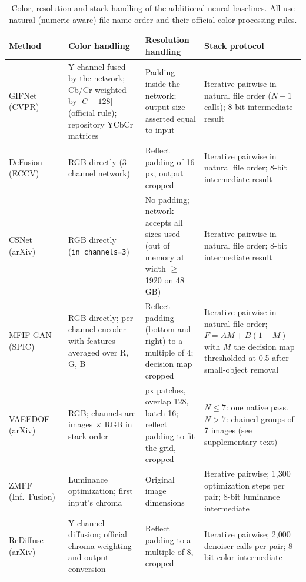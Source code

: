 \begin{table}[htbp]
\caption{Color, resolution and stack handling of the additional neural baselines. All use natural (numeric-aware) file name order and their official color-processing rules.}
\label{tab:deploy_handling}
\scriptsize
\renewcommand{\arraystretch}{0.95}
\setlength{\abovecaptionskip}{2pt}
\setlength{\belowcaptionskip}{2pt}
\begin{tabular}{@{}>{\raggedright\arraybackslash}p{1.9cm}>{\raggedright\arraybackslash}p{3.1cm}>{\raggedright\arraybackslash}p{3.1cm}>{\raggedright\arraybackslash}p{3.8cm}@{}}
\toprule
Method & Color handling & Resolution handling & Stack protocol \\
\midrule
GIFNet (CVPR)~\cite{cheng2025gifnet} & Y channel fused by the network; Cb/Cr weighted by $|C-128|$ (official rule); repository YCbCr matrices & Padding inside the network; output size asserted equal to input & Iterative pairwise in natural file order ($N-1$ calls); 8-bit intermediate result \\
DeFusion (ECCV)~\cite{liang2022defusion} & RGB directly (3-channel network) & Reflect padding of 16 px, output cropped & Iterative pairwise in natural file order; 8-bit intermediate result \\
CSNet (arXiv)~\cite{csnet2026} & RGB directly (\texttt{in\_channels=3}) & No padding; network accepts all sizes used (out of memory at width $\geq$1920 on 48 GB) & Iterative pairwise in natural file order; 8-bit intermediate result \\
MFIF-GAN (SPIC)~\cite{wang2021mfifgan} & RGB directly; per-channel encoder with features averaged over R, G, B & Reflect padding (bottom and right) to a multiple of 4; decision map cropped & Iterative pairwise in natural file order; $F=AM+B(1-M)$ with $M$ the decision map thresholded at 0.5 after small-object removal \\
VAEEDOF (arXiv)~\cite{vaeedof2025} & RGB; channels are images $\times$ RGB in stack order & 512 px patches, overlap 128, batch 16; reflect padding to fit the grid, cropped & $N\leq7$: one native pass. $N>7$: chained groups of 7 images (see supplementary text) \\
ZMFF (Inf.\ Fusion)~\cite{hu2023zmff} & Luminance optimization; first input's chroma & Original image dimensions & Iterative pairwise; 1,300 optimization steps per pair; 8-bit luminance intermediate \\
ReDiffuse (arXiv)~\cite{rediffuse2026} & Y-channel diffusion; official chroma weighting and output conversion & Reflect padding to a multiple of 8, cropped & Iterative pairwise; 2,000 denoiser calls per pair; 8-bit color intermediate \\
\bottomrule
\end{tabular}
\end{table}
